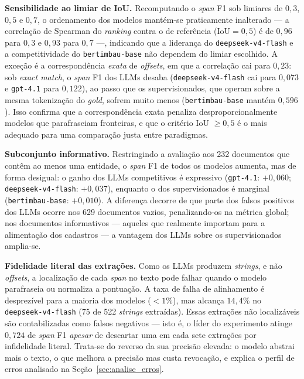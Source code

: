\textbf{Sensibilidade ao limiar de IoU.} Recomputando o \textit{span} F1 sob limiares de $0{,}3$, $0{,}5$ e $0{,}7$, o ordenamento dos modelos mantém-se praticamente inalterado --- a correlação de Spearman do \textit{ranking} contra o de referência ($\mathrm{IoU} = 0{,}5$) é de $0{,}96$ para $0{,}3$ e $0{,}93$ para $0{,}7$ ---, indicando que a liderança do \texttt{deepseek-v4-flash} e a competitividade do \texttt{bertimbau-base} não dependem do limiar escolhido. A exceção é a correspondência \emph{exata} de \textit{offsets}, em que a correlação cai para $0{,}23$: sob \textit{exact match}, o \textit{span} F1 dos LLMs desaba (\texttt{deepseek-v4-flash} cai para $0{,}073$ e \texttt{gpt-4.1} para $0{,}122$), ao passo que os supervisionados, que operam sobre a mesma tokenização do \textit{gold}, sofrem muito menos (\texttt{bertimbau-base} mantém $0{,}596$). Isso confirma que a correspondência exata penaliza desproporcionalmente modelos que parafraseiam fronteiras, e que o critério IoU $\geq 0{,}5$ é o mais adequado para uma comparação justa entre paradigmas.

\textbf{Subconjunto informativo.} Restringindo a avaliação aos 232 documentos que contêm ao menos uma entidade, o \textit{span} F1 de todos os modelos aumenta, mas de forma desigual: o ganho dos LLMs competitivos é expressivo (\texttt{gpt-4.1}: $+0{,}060$; \texttt{deepseek-v4-flash}: $+0{,}037$), enquanto o dos supervisionados é marginal (\texttt{bertimbau-base}: $+0{,}010$). A diferença decorre de que parte dos falsos positivos dos LLMs ocorre nos 629 documentos vazios, penalizando-os na métrica global; nos documentos informativos --- aqueles que realmente importam para a alimentação dos cadastros --- a vantagem dos LLMs sobre os supervisionados amplia-se.

\textbf{Fidelidade literal das extrações.} Como os LLMs produzem \textit{strings}, e não \textit{offsets}, a localização de cada \textit{span} no texto pode falhar quando o modelo parafraseia ou normaliza a pontuação. A taxa de falha de alinhamento é desprezível para a maioria dos modelos ($< 1\%$), mas alcança $14{,}4\%$ no \texttt{deepseek-v4-flash} (75 de 522 \textit{strings} extraídas). Essas extrações não localizáveis são contabilizadas como falsos negativos --- isto é, o líder do experimento atinge $0{,}724$ de \textit{span} F1 \emph{apesar} de descartar uma em cada sete extrações por infidelidade literal. Trata-se do reverso da sua precisão elevada: o modelo abstrai mais o texto, o que melhora a precisão mas custa revocação, e explica o perfil de erros analisado na Seção~\ref{sec:analise_erros}.

